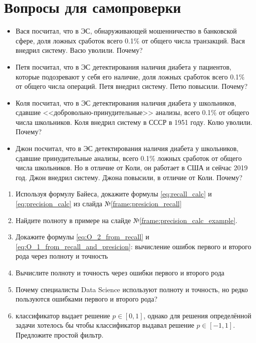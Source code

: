  \section{Вопросы для самопроверки}
  
  \begin{frame}
  \small
  \begin{itemize}
  	\item Вася посчитал, что в ЭС, обнаруживающей мошенничество в банковской сфере,
  	доля ложных сработок всего 0.1\% от общего числа транзакций. 
  	Вася внедрил систему. Васю уволили. Почему?
  	\item Петя посчитал, что в ЭС детектирования наличия диабета у пациентов,
  	которые подозревают у себя его наличие, 
  	доля ложных сработок всего 0.1\% от общего числа операций.
  	Петя внедрил систему. Петю повысили. Почему?
  	\item Коля посчитал, что в ЭС детектирования наличия диабета у 
  	школьников, сдавшие <<добровольно-принудительные>> анализы, 
  	всего 0.1\% от общего числа школьников. Коля внедрил систему в СССР в 1951 году. Колю уволили. Почему?
  	\item Джон посчитал, что в ЭС детектирования наличия диабета у 
  	школьников, сдавшие принудительные анализы, 
  	всего 0.1\% ложных сработок от общего числа школьников. 
  	Но в отличие от Коли, он работает в США и сейчас 2019 год. 
  	Джон внедрил систему. Джона повысили, в отличие от Коли. Почему?
  \end{itemize}

  \end{frame}
  
\begin{frame}
  \begin{enumerate}
    \item Используя формулу Байеса, докажите формулы \eqref{eq:recall_calc} и \eqref{eq:precision_calc} из слайда №\ref{frame:presicion_recall}
    \item Найдите полноту в примере на слайде №\ref{frame:precision_calc_example}.
    
   
   \item Докажите формулы \eqref{eq:O_2_from_recall}
     и
     \eqref{eq:O_1_from_recall_and_presicion}:
     вычисление ошибок первого и второго рода 
     через полноту и точность
  
   \item Вычислите полноту и точность через ошибки первого и второго рода
  
   \item Почему специалисты Data Science используют полноту и точность, 
  но редко пользуются ошибками первого и второго рода?
  
      \item классификатор выдает решение $p \in [0, 1]$, однако для решения
      определённой задачи хотелось бы чтобы классификатор выдавал решение $p \in [-1, 1]$.
      Предложите простой фильтр.
  \end{enumerate}   
\end{frame}

